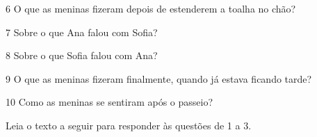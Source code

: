 \num{6} O que as meninas fizeram depois de estenderem a toalha no chão?



\num{7} Sobre o que Ana falou com Sofia?



\num{8} Sobre o que Sofia falou com Ana?



\num{9} O que as meninas fizeram finalmente, quando já estava ficando tarde?



\num{10} Como as meninas se sentiram após o passeio?




Leia o texto a seguir para responder às questões de 1 a 3.

